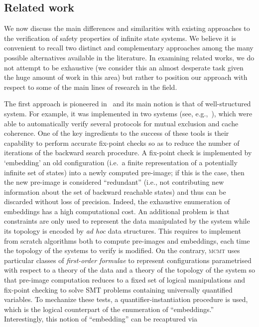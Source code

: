 \documentclass{LMCS}
\theoremstyle{plain}\newtheorem{assumption}[thm]{Assumption}
\theoremstyle{plain}\newtheorem{proposition}[thm]{Proposition}
\theoremstyle{plain}\newtheorem{property}[thm]{Property}
\theoremstyle{plain}\newtheorem{example}[thm]{Example}
\theoremstyle{plain}\newtheorem{claim}[thm]{Claim}
\theoremstyle{plain}\newtheorem{lemma}[thm]{Lemma}
\begin{document}
\subsection{Related work}

We now discuss the main differences and similarities with existing
approaches to the verification of safety properties of infinite state
systems.  We believe it is convenient to recall two distinct and
complementary approaches among the many possible alternatives
available in the literature.  In examining related works, we do not
attempt to be exhaustive (we consider this an almost desperate task
given the huge amount of work in this area) but rather to position our
approach with respect to
some of the main lines of research in the field.

The first approach is pioneered in~\cite{lics} and its main notion is
that of well-structured system.  For example, it was implemented in
two systems (see, e.g.,~\cite{tacas06,cav06}),
which were able to automatically verify several protocols for mutual
exclusion and cache coherence.  One of the key ingredients to the
success of these tools is their capability to perform accurate
fix-point checks so as to reduce the number of iterations of the
backward search procedure.  A fix-point check is implemented by
`embedding' an old configuration (i.e.\ a finite representation of a
potentially infinite set of states) into a newly computed pre-image;
if this is the case, then the new pre-image is considered
``redundant'' (i.e., not contributing new information about the set of
backward reachable states) and thus can be discarded without loss of
precision.  Indeed, the exhaustive enumeration of embeddings has a
high computational cost.  An additional problem is that constraints
are only used to represent the data manipulated by the system while
its topology is encoded by \emph{ad hoc} data structures.  This
requires to implement from scratch algorithms both to compute
pre-images and embeddings, each time the topology of the systems to
verify is modified.  On the contrary, \textsc{mcmt} uses particular
classes of \emph{first-order formulae} to represent configurations
parametrised with respect to a theory of the data and a theory of the
topology of the system so that pre-image computation reduces to a
fixed set of logical manipulations and fix-point checking to solve SMT
problems containing universally quantified variables.  To mechanize
these tests, a quantifier-instantiation procedure is used, which is
the logical counterpart of the enumeration of ``embeddings.''
Interestingly, this notion of ``embedding'' can be recaptured via
\end{document}
